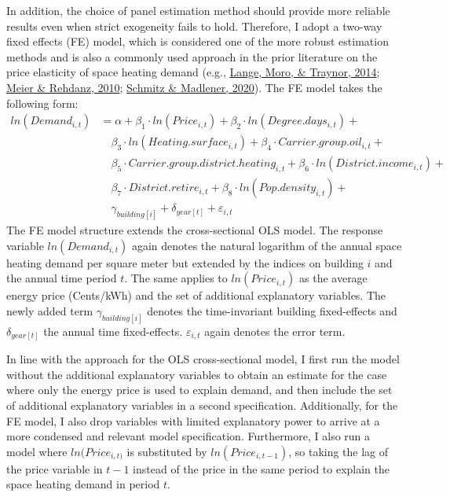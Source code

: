 \documentclass[12pt,twoside]{reedthesis}
\begin{document}
In addition, the choice of panel estimation method should provide more reliable results even when strict exogeneity fails to hold. Therefore, I adopt a two-way fixed effects (FE) model, which is considered one of the more robust estimation methods and is also a commonly used approach in the prior literature on the price elasticity of space heating demand (e.g., \protect\hyperlink{ref-lange_etal14}{Lange, Moro, \& Traynor, 2014}; \protect\hyperlink{ref-meier_rehdanz10}{Meier \& Rehdanz, 2010}; \protect\hyperlink{ref-schmitz_madlener20}{Schmitz \& Madlener, 2020}). The FE model takes the following form:
\begin{align*}
ln(Demand_{i,t}) & = \alpha + \beta_1 \cdot ln(Price_{i,t}) + \beta_2 \cdot ln(Degree.days_{i,t}) + \\
 & \quad \beta_3 \cdot ln(Heating.surface_{i,t}) + \beta_{4} \cdot Carrier.group.oil_{i,t} + \\
 & \quad \beta_{5} \cdot Carrier.group.district.heating_{i,t} + \beta_{6} \cdot ln(District.income_{i,t}) + \\
 & \quad \beta_{7} \cdot District.retire_{i,t} + \beta_{8} \cdot ln(Pop.density_{i,t}) + \\
 & \quad \gamma_{building[i]} + \delta_{year[t]} + \varepsilon_{i,t}
\end{align*}
The FE model structure extends the cross-sectional OLS model. The response variable \(ln(Demand_{i,t})\) again denotes the natural logarithm of the annual space heating demand per square meter but extended by the indices on building \(i\) and the annual time period \(t\). The same applies to \(ln(Price_{i,t})\) as the average energy price (Cents/kWh) and the set of additional explanatory variables. The newly added term \(\gamma_{building[i]}\) denotes the time-invariant building fixed-effects and \(\delta_{year[t]}\) the annual time fixed-effects. \(\varepsilon_{i,t}\) again denotes the error term.

In line with the approach for the OLS cross-sectional model, I first run the model without the additional explanatory variables to obtain an estimate for the case where only the energy price is used to explain demand, and then include the set of additional explanatory variables in a second specification. Additionally, for the FE model, I also drop variables with limited explanatory power to arrive at a more condensed and relevant model specification. Furthermore, I also run a model where \(ln(Price_{i,t)}\) is substituted by \(ln(Price_{i,t-1})\), so taking the lag of the price variable in \(t-1\) instead of the price in the same period to explain the space heating demand in period \(t\).
\end{document}
